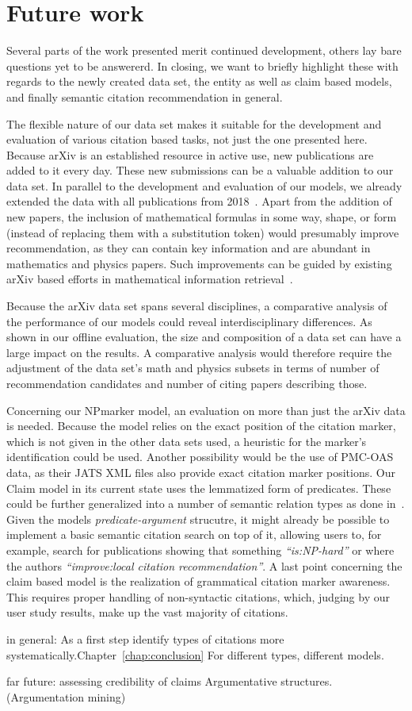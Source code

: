 \chapter{Future work}\label{chap:todo}
Several parts of the work presented merit continued development, others lay bare questions yet to be answererd. In closing, we want to briefly highlight these with regards to the newly created data set, the entity as well as claim based models, and finally semantic citation recommendation in general.

The flexible nature of our data set makes it suitable for the development and evaluation of various citation based tasks, not just the one presented here. Because arXiv is an established resource in active use, new publications are added to it every day. These new submissions can be a valuable addition to our data set. In parallel to the development and evaluation of our models, we already extended the data with all publications from 2018~\cite{Saier2019}. Apart from the addition of new papers, the inclusion of mathematical formulas in some way, shape, or form (instead of replacing them with a substitution token) would presumably improve recommendation, as they can contain key information and are abundant in mathematics and physics papers. Such improvements can be guided by existing arXiv based efforts in mathematical information retrieval~\cite{Aizawa2014,Zanibbi2016}.

Because the arXiv data set spans several disciplines, a comparative analysis of the performance of our models could reveal interdisciplinary differences. As shown in our offline evaluation, the size and composition of a data set can have a large impact on the results. A comparative analysis would therefore require the adjustment of the data set's math and physics subsets in terms of number of recommendation candidates and number of citing papers describing those.

Concerning our NPmarker model, an evaluation on more than just the arXiv data is needed. Because the model relies on the exact position of the citation marker, which is not given in the other data sets used, a heuristic for the marker's identification could be used. Another possibility would be the use of PMC-OAS data, as their JATS XML files also provide exact citation marker positions. Our Claim model in its current state uses the lemmatized form of predicates. These could be further generalized into a number of semantic relation types as done in~\cite{Gabor2018}. Given the models \emph{predicate-argument} strucutre, it might already be possible to implement a basic semantic citation search on top of it, allowing users to, for example, search for publications showing that something \emph{``is:NP-hard''} or where the authors \emph{``improve:local citation recommendation''}. A last point concerning the claim based model is the realization of grammatical citation marker awareness. This requires proper handling of non-syntactic citations, which, judging by our user study results, make up the vast majority of citations.

in general:
As a first step identify types of citations more systematically.Chapter~\ref{chap:conclusion}
For different types, different models.

far future:
assessing credibility of claims\cite{Popat2016}
Argumentative structures. (Argumentation mining\cite{Stab2016,Lippi2016,Habernal2017})
